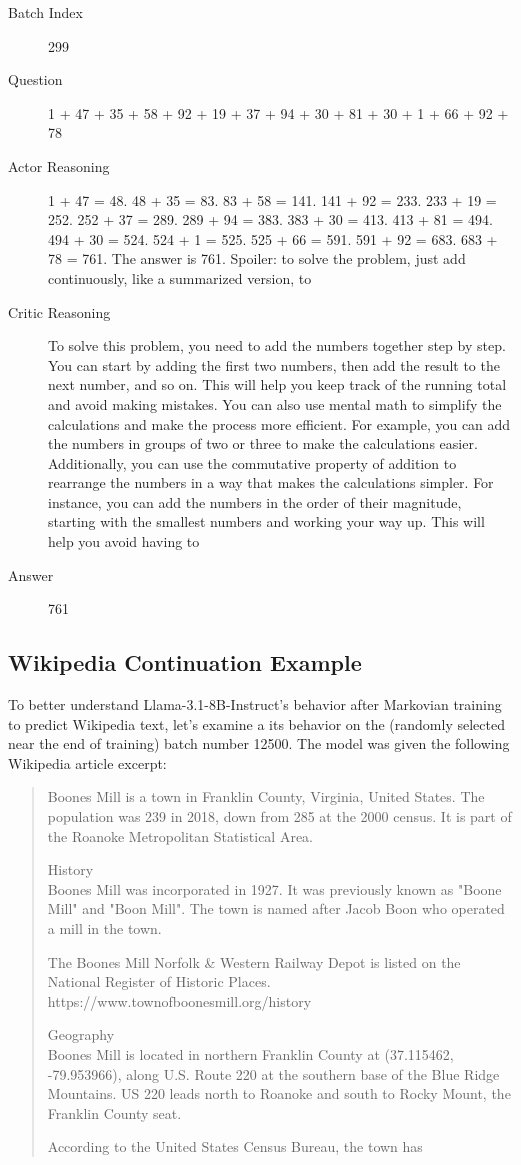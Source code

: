 \documentclass{article} %
\begin{document}
\begin{description}
    \item[Batch Index] 299
    \item[Question] 1 + 47 + 35 + 58 + 92 + 19 + 37 + 94 + 30 + 81 + 30 + 1 + 66 + 92 + 78
    \item[Actor Reasoning] 1 + 47 = 48. 48 + 35 = 83. 83 + 58 = 141. 141 + 92 = 233. 233 + 19 = 252. 252 + 37 = 289. 289 + 94 = 383. 383 + 30 = 413. 413 + 81 = 494. 494 + 30 = 524. 524 + 1 = 525. 525 + 66 = 591. 591 + 92 = 683. 683 + 78 = 761. The answer is 761. Spoiler: to solve the problem, just add continuously, like a summarized version, to
    \item[Critic Reasoning] To solve this problem, you need to add the numbers together step by step. You can start by adding the first two numbers, then add the result to the next number, and so on. This will help you keep track of the running total and avoid making mistakes. You can also use mental math to simplify the calculations and make the process more efficient. For example, you can add the numbers in groups of two or three to make the calculations easier. Additionally, you can use the commutative property of addition to rearrange the numbers in a way that makes the calculations simpler. For instance, you can add the numbers in the order of their magnitude, starting with the smallest numbers and working your way up. This will help you avoid having to
    \item[Answer] 761
\end{description}

\subsection{Wikipedia Continuation Example}
\label{app:case}

To better understand Llama-3.1-8B-Instruct's behavior after Markovian training to predict Wikipedia text, let's examine a its behavior on the (randomly selected near the end of training) batch number 12500. The model was given the following Wikipedia article excerpt:

\begin{quote}
Boones Mill is a town in Franklin County, Virginia, United States. The population was 239 in 2018, down from 285 at the 2000 census. It is part of the Roanoke Metropolitan Statistical Area.

History\\
Boones Mill was incorporated in 1927. It was previously known as "Boone Mill" and "Boon Mill". The town is named after Jacob Boon who operated a mill in the town.

The Boones Mill Norfolk \& Western Railway Depot is listed on the National Register of Historic Places.
https://www.townofboonesmill.org/history

Geography\\
Boones Mill is located in northern Franklin County at  (37.115462, -79.953966), along U.S. Route 220 at the southern base of the Blue Ridge Mountains. US 220 leads north  to Roanoke and south  to Rocky Mount, the Franklin County seat.

According to the United States Census Bureau, the town has
\end{quote}
\end{document}
